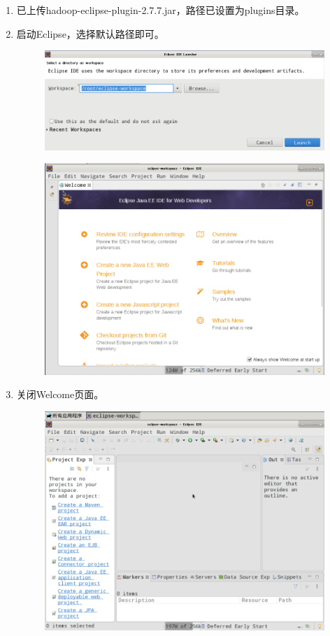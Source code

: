 \documentclass {article}
\begin{document}
				\begin{enumerate}
					\item 已上传hadoop-eclipse-plugin-2.7.7.jar，路径已设置为plugins目录。
					\item 启动Eclipse，选择默认路径即可。
					\begin{figure}[H]
						\centering
						\includegraphics[width=4.5in]{figures/fig1.png}
					\end{figure}
					\begin{figure}[H]
						\centering
						\includegraphics[width=4.5in]{figures/fig2.png}
					\end{figure}
				
					\item 关闭Welcome页面。
					\begin{figure}[H]
						\centering
						\includegraphics[width=4.5in]{figures/fig3.png}
					\end{figure}
				

\end{enumerate}
\end{document}
